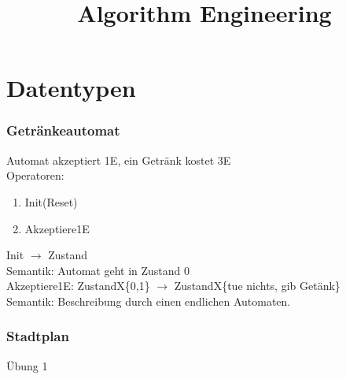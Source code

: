 \documentclass[a4paper]{article}
\begin{document}
\title{Algorithm Engineering}
\maketitle
\section{Datentypen}

\subsubsection*{Getränkeautomat}
Automat akzeptiert 1E, ein Getränk kostet 3E\\
Operatoren:
\begin{enumerate}
\item Init(Reset)
\item Akzeptiere1E
\end{enumerate}
Init $\rightarrow$ Zustand\\
\hspace*{0.5cm}Semantik: Automat geht in Zustand 0\\
Akzeptiere1E: ZustandX\{0,1\} $\rightarrow$ ZustandX\{tue nichts, gib Getänk\}\\
\hspace*{0.5cm}Semantik: Beschreibung durch einen endlichen Automaten.
\subsubsection*{Stadtplan}
Übung 1
\end{document}

